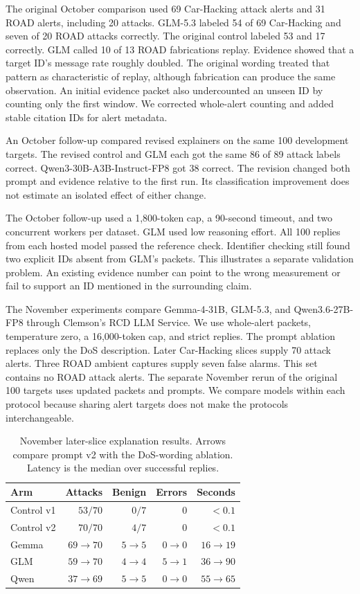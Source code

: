 \documentclass[sigconf,pbalance=true]{acmart}
\begin{document}
The original October comparison used 69 Car-Hacking attack alerts and 31 ROAD alerts, including 20 attacks. GLM-5.3 labeled 54 of 69 Car-Hacking and seven of 20 ROAD attacks correctly. The original control labeled 53 and 17 correctly. GLM called 10 of 13 ROAD fabrications replay. Evidence showed that a target ID's message rate roughly doubled. The original wording treated that pattern as characteristic of replay, although fabrication can produce the same observation. An initial evidence packet also undercounted an unseen ID by counting only the first window. We corrected whole-alert counting and added stable citation IDs for alert metadata.

An October follow-up compared revised explainers on the same 100 development targets. The revised control and GLM each got the same 86 of 89 attack labels correct. Qwen3-30B-A3B-Instruct-FP8 got 38 correct. The revision changed both prompt and evidence relative to the first run. Its classification improvement does not estimate an isolated effect of either change.

The October follow-up used a 1,800-token cap, a 90-second timeout, and two concurrent workers per dataset. GLM used low reasoning effort. All 100 replies from each hosted model passed the reference check. Identifier checking still found two explicit IDs absent from GLM's packets. This illustrates a separate validation problem. An existing evidence number can point to the wrong measurement or fail to support an ID mentioned in the surrounding claim.

The November experiments compare Gemma-4-31B, GLM-5.3, and Qwen3.6-27B-FP8 through Clemson's RCD LLM Service. We use whole-alert packets, temperature zero, a 16,000-token cap, and strict replies. The prompt ablation replaces only the DoS description. Later Car-Hacking slices supply 70 attack alerts. Three ROAD ambient captures supply seven false alarms. This set contains no ROAD attack alerts. The separate November rerun of the original 100 targets uses updated packets and prompts. We compare models within each protocol because sharing alert targets does not make the protocols interchangeable.

\begin{table}[t]
  \caption{November later-slice explanation results. Arrows compare prompt v2 with the DoS-wording ablation. Latency is the median over successful replies.}
  \label{tab:heldout}
  \small
  \centering
  \begin{tabular}{@{}lrrrr@{}}
  \toprule
  Arm & Attacks & Benign & Errors & Seconds \\
  \midrule
  Control v1 & $53/70$ & $0/7$ & 0 & $<0.1$ \\
  Control v2 & $70/70$ & $4/7$ & 0 & $<0.1$ \\
  Gemma & $69 \to 70$ & $5 \to 5$ & $0 \to 0$ & $16 \to 19$ \\
  GLM & $59 \to 70$ & $4 \to 4$ & $5 \to 1$ & $36 \to 90$ \\
  Qwen & $37 \to 69$ & $5 \to 5$ & $0 \to 0$ & $55 \to 65$ \\
  \bottomrule
  \end{tabular}
\end{table}
\end{document}
